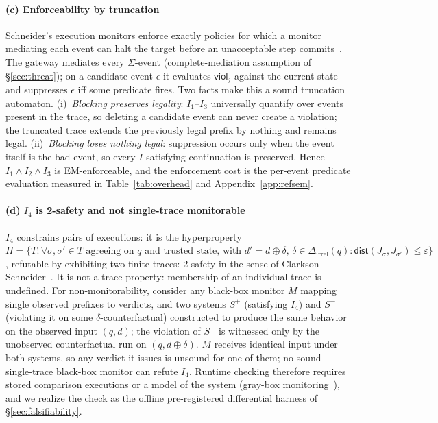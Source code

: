 \documentclass[conference]{IEEEtran}
\newcommand{\Ione}{\ensuremath{I_1}}
\newcommand{\Itwo}{\ensuremath{I_2}}
\newcommand{\Ithree}{\ensuremath{I_3}}
\newcommand{\Ifour}{\ensuremath{I_4}}
\newcommand{\Dirrel}{\ensuremath{\Delta_{\mathrm{irrel}}}}
\newcommand{\dist}{\ensuremath{\mathsf{dist}}}
\begin{document}
\paragraph{(c) Enforceability by truncation}
Schneider's execution monitors enforce exactly policies for which
a monitor mediating each event can halt the target before an
unacceptable step commits~\cite{schneider}. The gateway mediates
every $\Sigma$-event (complete-mediation assumption of
\S\ref{sec:threat}); on a candidate event $\epsilon$ it evaluates
$\mathsf{viol}_j$ against the current state and suppresses
$\epsilon$ iff some predicate fires. Two facts make this a sound
truncation automaton. (i)~\emph{Blocking preserves legality}:
\Ione--\Ithree{} universally quantify over events present in the
trace, so deleting a candidate event can never create a violation;
the truncated trace extends the previously legal prefix by nothing
and remains legal. (ii)~\emph{Blocking loses nothing legal}:
suppression occurs only when the event itself is the bad event, so
every $I$-satisfying continuation is preserved. Hence
$\Ione \wedge \Itwo \wedge \Ithree$ is EM-enforceable, and the
enforcement cost is the per-event predicate evaluation measured in
Table~\ref{tab:overhead} and Appendix~\ref{app:refsem}.

\paragraph{(d) \Ifour{} is 2-safety and not single-trace monitorable}
\Ifour{} constrains pairs of executions: it is the hyperproperty
$H = \{T : \forall \sigma, \sigma' \in T \text{ agreeing on } q
\text{ and trusted state, with } d' = d \oplus \delta,\,
\delta \in \Dirrel(q) : \dist(J_\sigma, J_{\sigma'}) \leq \varepsilon\}$,
refutable by exhibiting two finite traces: 2-safety in the sense
of Clarkson--Schneider~\cite{hyperprops}. It is not a trace
property: membership of an individual trace is undefined. For
non-monitorability, consider any black-box monitor $M$ mapping
single observed prefixes to verdicts, and two systems $S^{+}$
(satisfying \Ifour) and $S^{-}$ (violating it on some
$\delta$-counterfactual) constructed to produce the same behavior
on the observed input $(q, d)$; the violation of $S^{-}$ is
witnessed only by the unobserved counterfactual run on
$(q, d \oplus \delta)$. $M$ receives identical input under both
systems, so any verdict it issues is unsound for one of them; no
sound single-trace black-box monitor can refute \Ifour. Runtime
checking therefore requires stored comparison executions or a
model of the system (gray-box monitoring~\cite{finkbeiner,stucki}), and we realize the check as the offline pre-registered
differential harness of \S\ref{sec:falsifiability}.
\end{document}
